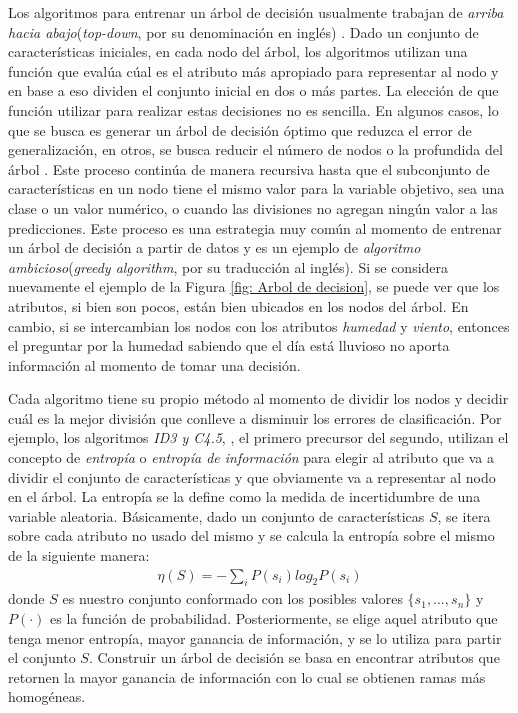 	Los algoritmos para entrenar un árbol de decisión usualmente trabajan de \textit{arriba hacia abajo}(\textit{top-down}, por su denominación en inglés) \cite{LROM05}. Dado un conjunto de características iniciales, en cada nodo del árbol, los algoritmos utilizan una función que evalúa cúal es el atributo más apropiado para representar al nodo y en base a eso dividen el conjunto inicial en dos o más partes. La elección de que función utilizar para realizar estas decisiones no es sencilla. En algunos casos, lo que se busca es generar un árbol de decisión óptimo que reduzca el error de generalización, en otros, se busca reducir el número de nodos o la profundida del árbol \cite{LROM10}. Este proceso continúa de manera recursiva hasta que el subconjunto de características en un nodo tiene el mismo valor para la variable objetivo, sea una clase o un valor numérico, o cuando las divisiones no agregan ningún valor a las predicciones. Este proceso es una estrategia muy común al momento de entrenar un árbol de decisión a partir de datos y es un ejemplo de \textit{algoritmo ambicioso}(\textit{greedy algorithm}, por su traducción al inglés). Si se considera nuevamente el e\-jem\-plo de la Figura \ref{fig: Arbol de decision}, se puede ver que los atributos, si bien son pocos, están bien ubicados en los nodos del árbol. En cambio, si se intercambian los nodos con los atributos \textit{humedad} y \textit{viento}, entonces el preguntar por la humedad sabiendo que el día está lluvioso no aporta información al momento de tomar una decisión.
	
	Cada algoritmo tiene su propio método al momento de dividir los nodos y decidir cuál es la mejor división que conlleve a disminuir los errores de clasificación. Por ejemplo, los algoritmos \textit{ID3 y C4.5}, \cite{QuinlanID3, QuinlanC45}, el primero precursor del segundo, utilizan el concepto de \textit{entropía} o \textit{entropía de información} para elegir al atributo que va a dividir el conjunto de características y que obviamente va a representar al nodo en el árbol. La entropía se la define como la medida de incertidumbre de una variable aleatoria.  Básicamente, dado un conjunto de características $S$, se itera sobre cada atributo no usado del mismo y se calcula la entropía sobre el mismo de la siguiente manera:
	\begin{align}
		\eta(S) = -\sum_i P(s_i)log_{2}P(s_i)
	\end{align}
	donde $S$ es nuestro conjunto conformado con los posibles valores $\{ s_1,\dots, s_n \}$ y $P( \cdot )$ es la función de probabilidad. Posteriormente, se elige aquel atributo que tenga menor entropía, mayor ganancia de información, y se lo utiliza para partir el conjunto $S$. Construir un árbol de decisión se basa en encontrar atributos que retornen la mayor ganancia de información con lo cual se obtienen ramas más homogéneas.
	
